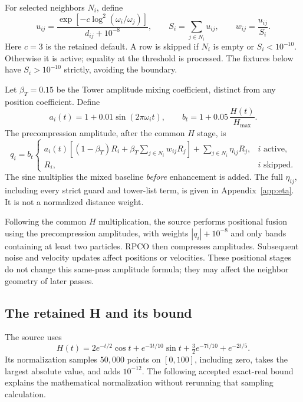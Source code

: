 \documentclass[11pt,a4paper]{article}
\theoremstyle{definition}
\theoremstyle{remark}\newtheorem{remark}[theorem]{Remark}
\numberwithin{equation}{section}
\begin{document}
For selected neighbors $N_i$, define
\begin{equation}\label{eq:weights}
 u_{ij}=\frac{\exp[-c\log^2(\omega_i/\omega_j)]}{d_{ij}+10^{-8}},
 \qquad S_i=\sum_{j\in N_i}u_{ij},\qquad
 w_{ij}=\frac{u_{ij}}{S_i}.
\end{equation}
Here $c=3$ is the retained default. A row is skipped if $N_i$ is empty or
$S_i<10^{-10}$. Otherwise it is active; equality at the threshold is processed.
The fixtures below have $S_i>10^{-10}$ strictly, avoiding the boundary.

Let $\beta_T=0.15$ be the Tower amplitude mixing coefficient, distinct from any
position coefficient. Define
\begin{equation}\label{eq:gains}
 a_i(t)=1+0.01\sin(2\pi\omega_i t),\qquad
 b_t=1+0.05\,\frac{H(t)}{H_{\max}}.
\end{equation}
The precompression amplitude, after the common $H$ stage, is
\begin{equation}\label{eq:full}
 q_i=b_t
 \begin{cases}
 a_i(t)\left[(1-\beta_T)R_i+\beta_T\sum_{j\in N_i}w_{ij}R_j\right]
       +\displaystyle\sum_{j\in N_i}\eta_{ij}R_j,&i\text{ active},\\
 R_i,&i\text{ skipped}.
 \end{cases}
\end{equation}
The sine multiplies the mixed baseline \emph{before} enhancement is added.
The full $\eta_{ij}$, including every strict guard and tower-list term, is given
in Appendix~\ref{app:eta}. It is not a normalized distance weight.

Following the common $H$ multiplication, the source performs positional fusion
using the precompression amplitudes, with weights $|q_i|+10^{-8}$ and only
bands containing at least two particles. RPCO then compresses amplitudes.
Subsequent noise and velocity updates affect positions or velocities.
These positional stages do not change this same-pass amplitude formula;
they may affect the neighbor geometry of later passes.

\subsection{The retained H and its bound}\label{sec:H}
The source uses
\begin{equation}\label{eq:H}
 H(t)=2e^{-t/2}\cos t+e^{-3t/10}\sin t
               +\tfrac32 e^{-7t/10}+e^{-2t/5}.
\end{equation}
Its normalization samples $50{,}000$ points on $[0,100]$, including zero, takes
the largest absolute value, and adds $10^{-12}$. The following accepted exact-real
bound \cite{G,OC05} explains the mathematical normalization without rerunning that
sampling calculation.
\end{document}
